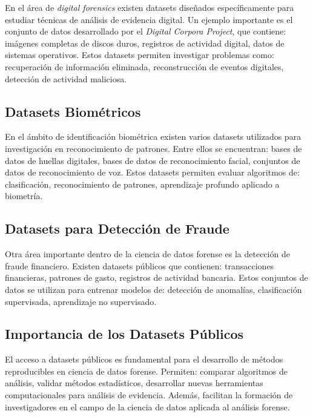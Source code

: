 \documentclass[a4paper,10pt,oneside]{article}
\begin{document}
En el \'area de \textit{digital forensics} existen datasets dise\~nados espec\'ificamente para estudiar t\'ecnicas de an\'alisis de evidencia digital. Un ejemplo importante es el conjunto de datos desarrollado por el \textit{Digital Corpora Project}, que contiene: im\'agenes completas de discos duros, registros de actividad digital, datos de sistemas operativos. Estos datasets permiten investigar problemas como: recuperaci\'on de informaci\'on eliminada, reconstrucci\'on de eventos digitales, detecci\'on de actividad maliciosa.


\subsection{Datasets Biom\'etricos}

En el \'ambito de identificaci\'on biom\'etrica existen varios datasets utilizados para investigaci\'on en reconocimiento de patrones. Entre ellos se encuentran: bases de datos de huellas digitales, bases de datos de reconocimiento facial, conjuntos de datos de reconocimiento de voz. Estos datasets permiten evaluar algoritmos de: clasificaci\'on, reconocimiento de patrones, aprendizaje profundo aplicado a biometr\'ia.

\subsection{Datasets para Detecci\'on de Fraude}

Otra \'area importante dentro de la ciencia de datos forense es la detecci\'on de fraude financiero. Existen datasets p\'ublicos que contienen: transacciones financieras, patrones de gasto, registros de actividad bancaria. Estos conjuntos de datos se utilizan para entrenar modelos de: detecci\'on de anomal\'ias, clasificaci\'on supervisada, aprendizaje no supervisado.


\subsection{Importancia de los Datasets P\'ublicos}

El acceso a datasets p\'ublicos es fundamental para el desarrollo de m\'etodos reproducibles en ciencia de datos forense. Permiten: comparar algoritmos de an\'alisis, validar m\'etodos estad\'isticos, desarrollar nuevas herramientas computacionales para an\'alisis de evidencia. Adem\'as, facilitan la formaci\'on de investigadores en el campo de la ciencia de datos aplicada al an\'alisis forense.
\end{document}
